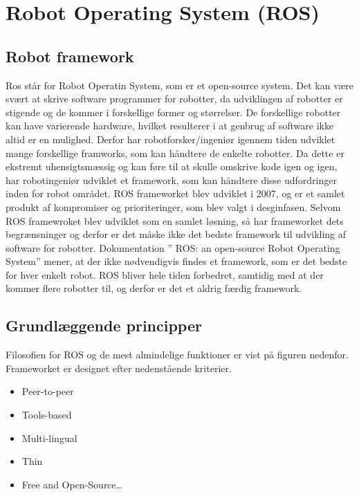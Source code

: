 \chapter{Robot Operating System (ROS)}\label{chap:ROS}
\section{Robot framework}
Ros står for Robot Operatin System, som er et open-source system. Det kan være svært at skrive software programmer for robotter, da udviklingen af robotter er stigende og de kommer i forskellige former og størrelser. De forskellige robotter kan have varierende hardware, hvilket resulterer i at genbrug af software ikke altid er en mulighed. Derfor har robotforsker/ingeniør igennem tiden udviklet mange forskellige framworks, som kan håndtere de enkelte robotter. Da dette er ekstremt uhensigtsmæssig og kan føre til at skulle omskrive kode igen og igen, har robotingeniør udviklet et framework, som kan håndtere disse udfordringer inden for robot området. ROS frameworket blev udviklet i 2007, og er et samlet produkt af kompromiser og prioriteringer, som blev valgt i desginfasen. Selvom ROS framewroket blev udviklet som en samlet løsning, så har frameworket dets begrænsninger og derfor er det måske ikke det bedste framework til udvikling af software for robotter. Dokumentation ” ROS: an open-source Robot Operating System” mener, at der ikke nødvendigvis findes et framework, som er det bedste for hver enkelt robot. ROS bliver hele tiden forbedret, samtidig med at der kommer flere robotter til, og derfor er det et aldrig færdig framework. \newline
\section{Grundlæggende principper}
Filosofien for ROS og de mest almindelige funktioner er vist på figuren nedenfor.
Frameworket er designet efter nedenstående kriterier. 
\begin{itemize}  
\item Peer-to-peer
\item Tools-based 
\item Multi-lingual
\item Thin
\item Free and Open-Source\ldots 
\end{itemize}
